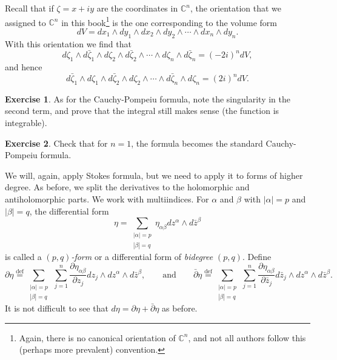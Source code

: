 \documentclass[12pt,openany]{book}
\newcommand{\abs}[1]{\left\lvert {#1} \right\rvert}
\newcommand{\C}{{\mathbb{C}}}
\newcommand{\myindex}[1]{#1\index{#1}}
\theoremstyle{plain}
\theoremstyle{remark}
\theoremstyle{definition}
\newenvironment{exbox}{%
    \def\FrameCommand{\vrule width 1pt \relax\hspace {10pt}}%
    \MakeFramed {\advance \hsize -\width \FrameRestore }%
}{%
    \endMakeFramed
}
\theoremstyle{exercise}
\newtheorem{exercise}{Exercise}[section]
\theoremstyle{example}
\begin{document}
Recall that if $\zeta = x+iy$ are the coordinates in $\C^n$, the orientation that we assigned to $\C^n$ in
this book\footnote{Again, there is
no canonical orientation of $\C^n$, and
not all authors follow this (perhaps more prevalent) convention.}
is the one corresponding to the volume form
\begin{equation*}
dV = dx_1 \wedge dy_1 \wedge dx_2 \wedge dy_2 \wedge \cdots \wedge dx_n \wedge dy_n .
\end{equation*}
With this orientation we find that
\begin{equation*}
d\zeta_1 \wedge d\bar{\zeta}_1 \wedge
d\zeta_2 \wedge d\bar{\zeta}_2 \wedge
\cdots \wedge
d\zeta_n \wedge d\bar{\zeta}_n = {(-2i)}^n dV ,
\end{equation*}
and hence
\begin{equation*}
d\bar{\zeta}_1 \wedge d\zeta_1 \wedge
d\bar{\zeta}_2 \wedge d\zeta_2 \wedge
\cdots \wedge
d\bar{\zeta}_n \wedge d\zeta_n = {(2i)}^n dV .
\end{equation*}

\begin{exbox}
\begin{exercise}
As for the Cauchy-Pompeiu formula,
note the singularity in the second term, and prove that the integral still makes
sense (the function is integrable).
\end{exercise}

\begin{exercise}
Check that for $n=1$, the formula becomes the standard Cauchy-Pompeiu
formula.
\end{exercise}
\end{exbox}

We will, again, apply Stokes formula, but we need to apply it to forms of higher
degree.  As before, we split the derivatives to the holomorphic and
antiholomorphic parts.  We work with multiindices.  For $\alpha$ and $\beta$
with $\abs{\alpha}=p$ and 
$\abs{\beta}=q$, the differential form
\begin{equation*}
\eta = 
\sum_{\substack{\abs{\alpha}=p \\ \abs{\beta}=q}}
\eta_{\alpha \beta} dz^\alpha \wedge d\bar{z}^\beta 
\end{equation*}
is called a \emph{\myindex{$(p,q)$-form}} or a differential form of
\emph{\myindex{bidegree}} $(p,q)$.
Define
\begin{equation*}
\partial \eta \overset{\text{def}}{=}
\sum_{\substack{\abs{\alpha}=p \\ \abs{\beta}=q}}
\,
\sum_{j=1}^n
\frac{\partial \eta_{\alpha \beta}}{\partial z_j} dz_j \wedge dz^\alpha
\wedge d\bar{z}^\beta ,
\qquad \text{and} \qquad
\bar{\partial} \eta \overset{\text{def}}{=}
\sum_{\substack{\abs{\alpha}=p \\ \abs{\beta}=q}}
\,
\sum_{j=1}^n
\frac{\partial \eta_{\alpha \beta}}{\partial \bar{z}_j} d\bar{z}_j \wedge dz^\alpha
\wedge d\bar{z}^\beta .
\end{equation*}
It is not difficult to see that $d \eta = \partial \eta +
\bar{\partial} \eta$ as before.
\end{document}
